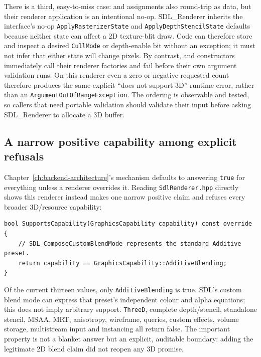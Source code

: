 There is a third, easy-to-miss case:  and
 assignments also round-trip as data, but their renderer application
is an intentional no-op.  SDL\_Renderer inherits the interface's no-op
\texttt{ApplyRasterizerState} and \texttt{ApplyDepthStencilState} defaults because neither
state can affect a 2D texture-blit draw.  Code can therefore store and inspect a desired
\texttt{CullMode} or depth-enable bit without an exception; it must not infer that either
state will change pixels.  By contrast,  and 
constructors immediately call their renderer factories and fail before their own argument
validation runs.  On this renderer even a zero or negative requested count therefore produces
the same explicit ``does not support 3D'' runtime error, rather than an
\texttt{ArgumentOutOfRangeException}.  The ordering is observable and tested, so callers that
need portable validation should validate their input before asking SDL\_Renderer to allocate a
3D buffer.

\subsection{A narrow positive capability among explicit refusals}

Chapter~\ref{ch:backend-architecture}'s  mechanism defaults to
answering \texttt{true} for everything unless a renderer overrides it. Reading
\texttt{SdlRenderer.hpp} directly shows this renderer instead makes one narrow positive claim
and refuses every broader 3D/resource capability:

\begin{lstlisting}
bool SupportsCapability(GraphicsCapability capability) const override
{
    // SDL_ComposeCustomBlendMode represents the standard Additive preset.
    return capability == GraphicsCapability::AdditiveBlending;
}
\end{lstlisting}

Of the current thirteen values, only \texttt{AdditiveBlending} is true. SDL's custom blend mode
can express that preset's independent colour and alpha equations; this does not imply arbitrary
 support. \texttt{ThreeD}, complete depth/stencil, standalone stencil,
MSAA, MRT, anisotropy, wireframe, queries, custom effects, volume storage, multistream input and
instancing all return false. The important property is not a blanket answer but an explicit,
auditable boundary: adding the legitimate 2D blend claim did not reopen any 3D promise.

